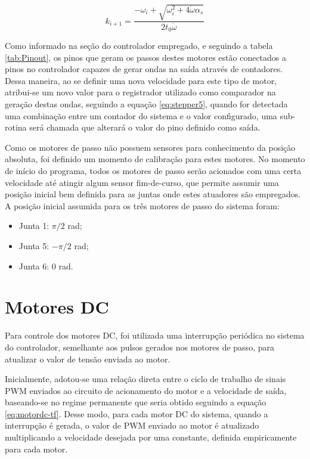 \begin{equation}
    \label{eq:stepper5}
    k_{i+1} = \frac{-\omega_i + \sqrt{\omega_i^2+4\dot{\omega}\alpha_s}}{2t_0\dot{\omega}}
\end{equation}

Como informado na seção do controlador empregado, e seguindo a tabela \ref{tab:Pinout}, os 
pinos que geram os passos destes motores estão conectados a pinos no controlador capazes de 
gerar ondas na saída através de contadores. Dessa maneira, ao se definir uma nova 
velocidade para este tipo de motor, atribui-se um novo valor para o registrador utilizado 
como comparador na geração destas ondas, seguindo a equação \ref{eq:stepper5}, quando for
detectada uma combinação entre um contador do sistema e o valor configurado, uma sub-rotina
será chamada que alterará o valor do pino definido como saída.

Como os motores de passo não possuem sensores para conhecimento da posição absoluta,
foi definido um momento de calibração para estes motores. No momento de início do programa, 
todos os motores de passo serão acionados com uma certa velocidade até atingir algum sensor 
fim-de-curso, que permite assumir uma posição inicial bem definida para as juntas onde estes
atuadores são empregados. A posição inicial assumida para os três motores de passo do sistema
foram: 

\begin{itemize}
    \item Junta 1: $\pi/2$ rad;
    \item Junta 5: $-\pi/2$ rad;
    \item Junta 6: $0$ rad.
\end{itemize}

\section{Motores DC}

Para controle dos motores DC, foi utilizada uma interrupção periódica no sistema do controlador,
semelhante aos pulsos gerados nos motores de passo, para atualizar o valor de tensão enviada
ao motor. 

Inicialmente, adotou-se uma relação direta entre o ciclo de trabalho de sinais PWM enviados 
ao circuito de acionamento do motor e a velocidade de saída, baseando-se no regime permanente 
que seria obtido seguindo a equação \ref{eq:motordc-tf}. Desse modo, para cada motor
DC do sistema, quando a interrupção é gerada, o valor de PWM enviado ao motor é atualizado
multiplicando a velocidade desejada por uma constante, definida empiricamente para cada motor.

